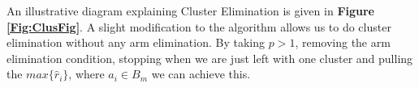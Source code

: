 
An illustrative diagram explaining Cluster Elimination is given in \textbf{Figure \ref{Fig:ClusFig}}. A slight modification to the algorithm allows us to do cluster elimination without any arm elimination. By taking $p>1$, removing the arm elimination condition, stopping when we are just left with one cluster and pulling the $max\lbrace \hat{r}_{i}\rbrace$, where $a_{i}\in B_{m}$ we can achieve this.
 

